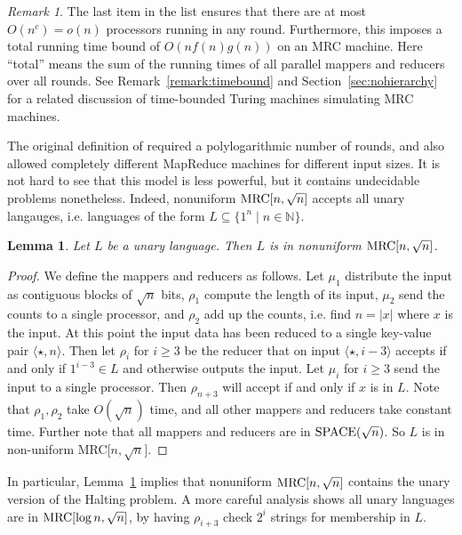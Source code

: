 \documentclass[11pt]{article}
\newtheorem{lemma}[thm]{Lemma}
\theoremstyle{definition}
\theoremstyle{remark}
\newtheorem{remark}{Remark}
\newcommand{\N}{\mathbb{N}}
\newcommand{\mrc}{\textup{MRC}}
\newcommand{\SPACE}{\textup{SPACE}}
\begin{document}
\begin{remark}
The last item in the list ensures that there are at most $O(n^c) = o(n)$
processors running in any round. Furthermore, this imposes a total running time
bound of $O(nf(n)g(n))$ on an MRC machine. Here ``total'' means the sum of the
running times of all parallel mappers and reducers over all rounds. See
Remark~\ref{remark:timebound} and Section~\ref{sec:nohierarchy} for a related
discussion of time-bounded Turing machines simulating MRC machines.
\end{remark}

The original definition of \cite{Karloff10} required a polylogarithmic number
of rounds, and also allowed completely different MapReduce machines for
different input sizes. It is not hard to see that this model is less powerful,
but it contains undecidable problems nonetheless. Indeed, nonuniform $\mrc[n,
\sqrt{n}]$ accepts all unary langauges, i.e. languages of the form $L \subseteq
\{1^n \mid n \in \N\}$.

\begin{lemma}\label{lemma:unary}
Let $L$ be a unary language. Then $L$ is in nonuniform $\mrc[n, \sqrt{n}]$.  
\end{lemma}

\begin{proof}
We define the mappers and reducers as follows. Let $\mu_1$ distribute the input
as contiguous blocks of $\sqrt{n}$ bits, $\rho_1$ compute the length of its
input, $\mu_2$ send the counts to a single processor, and $\rho_2$ add up the
counts, i.e. find $n=|x|$ where $x$ is the input. At this point the input data
has been reduced to a single key-value pair $\langle \star, n \rangle$.  Then
let $\rho_i$ for $i \ge 3$ be the reducer that on input $\langle \star, i-3
\rangle$ accepts if and only if $1^{i-3} \in L$ and otherwise outputs the
input. Let $\mu_i$ for $i \ge 3$ send the input to a single processor. Then
$\rho_{n+3}$ will accept if and only if $x$ is in $L$. Note that $\rho_1,
\rho_2$ take $O(\sqrt{n})$ time, and all other mappers and reducers take
constant time. Further note that all mappers and reducers are in
$\SPACE(\sqrt{n})$. So $L$ is in non-uniform MRC[$n, \sqrt{n}$].  \end{proof}

In particular, Lemma~\ref{lemma:unary} implies that nonuniform $\mrc[n,
\sqrt{n}]$ contains the unary version of the Halting problem. A more careful
analysis shows all unary languages are in $\mrc[\log n, \sqrt{n}]$, by having
$\rho_{i+3}$ check $2^i$ strings for membership in $L$.
\end{document}
